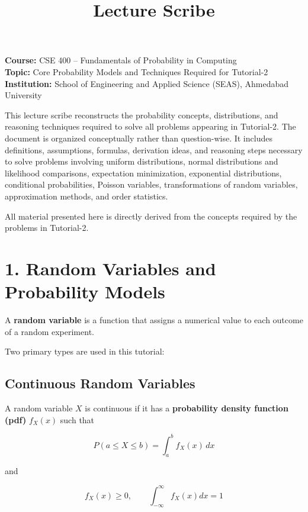 \documentclass[12pt]{article}
\begin{document}
\title{Lecture Scribe}
\date{}
\maketitle

\textbf{Course:} CSE 400 – Fundamentals of Probability in Computing\\
\textbf{Topic:} Core Probability Models and Techniques Required for Tutorial-2\\
\textbf{Institution:} School of Engineering and Applied Science (SEAS), Ahmedabad University

\vspace{1em}

This lecture scribe reconstructs the probability concepts, distributions, and reasoning techniques required to solve all problems appearing in Tutorial-2. The document is organized conceptually rather than question-wise. It includes definitions, assumptions, formulas, derivation ideas, and reasoning steps necessary to solve problems involving uniform distributions, normal distributions and likelihood comparisons, expectation minimization, exponential distributions, conditional probabilities, Poisson variables, transformations of random variables, approximation methods, and order statistics.

All material presented here is directly derived from the concepts required by the problems in Tutorial-2.

\section*{1. Random Variables and Probability Models}

A \textbf{random variable} is a function that assigns a numerical value to each outcome of a random experiment.

Two primary types are used in this tutorial:

\subsection*{Continuous Random Variables}

A random variable $X$ is continuous if it has a \textbf{probability density function (pdf)} $f_X(x)$ such that

\[
P(a \le X \le b) = \int_a^b f_X(x)\,dx
\]

and

\[
f_X(x) \ge 0, \qquad \int_{-\infty}^{\infty} f_X(x) dx = 1
\]
\end{document}

